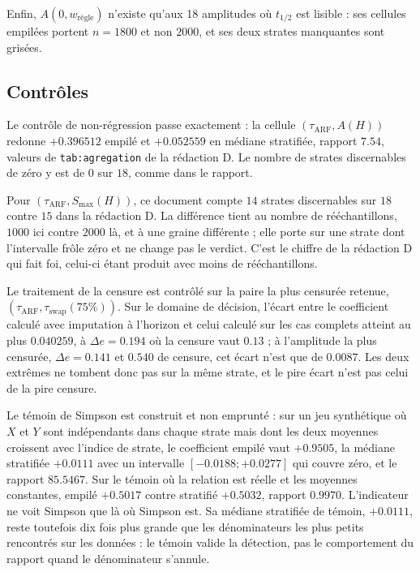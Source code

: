 \documentclass[11pt,a4paper]{article}
\begin{document}
Enfin, $A(0,w_{\text{règle}})$ n'existe qu'aux 18 amplitudes où $t_{1/2}$ est lisible : ses
cellules empilées portent $n = 1800$ et non $2000$, et ses deux strates manquantes sont
grisées.

\subsection{Contrôles}

Le contrôle de non-régression passe exactement : la cellule $(\tau_{\mathrm{ARF}}, A(H))$
redonne $+0.396512$ empilé et $+0.052559$ en médiane stratifiée, rapport $7.54$, valeurs de
\texttt{tab:agregation} de la rédaction D. Le nombre de strates discernables de zéro y est de
$0$ sur $18$, comme dans le rapport.

Pour $(\tau_{\mathrm{ARF}}, S_{\max}(H))$, ce document compte $14$ strates discernables sur
$18$ contre $15$ dans la rédaction D. La différence tient au nombre de rééchantillons,
$1000$ ici contre $2000$ là, et à une graine différente ; elle porte sur une strate dont
l'intervalle frôle zéro et ne change pas le verdict. C'est le chiffre de la rédaction D qui
fait foi, celui-ci étant produit avec moins de rééchantillons.

Le traitement de la censure est contrôlé sur la paire la plus censurée retenue,
$(\tau_{\mathrm{ARF}}, \tau_{\mathrm{swap}}(75\%))$. Sur le domaine de décision, l'écart entre
le coefficient calculé avec imputation à l'horizon et celui calculé sur les cas complets
atteint au plus $0.040259$, à $\Delta e = 0.194$ où la censure vaut $0.13$ ; à l'amplitude la
plus censurée, $\Delta e = 0.141$ et $0.540$ de censure, cet écart n'est que de $0.0087$. Les
deux extrêmes ne tombent donc pas sur la même strate, et le pire écart n'est pas celui de la
pire censure.

Le témoin de Simpson est construit et non emprunté : sur un jeu synthétique où $X$ et $Y$
sont indépendants dans chaque strate mais dont les deux moyennes croissent avec l'indice de
strate, le coefficient empilé vaut $+0.9505$, la médiane stratifiée $+0.0111$ avec un
intervalle $[-0.0188 ; +0.0277]$ qui couvre zéro, et le rapport $85.5467$. Sur le témoin où la
relation est réelle et les moyennes constantes, empilé $+0.5017$ contre stratifié $+0.5032$,
rapport $0.9970$. L'indicateur ne voit Simpson que là où Simpson est. Sa médiane stratifiée
de témoin, $+0.0111$, reste toutefois dix fois plus grande que les dénominateurs les plus
petits rencontrés sur les données : le témoin valide la détection, pas le comportement du
rapport quand le dénominateur s'annule.
\end{document}
